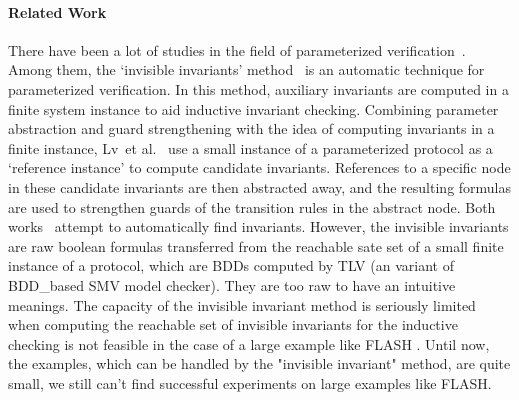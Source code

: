 \documentclass[final]{IEEEtran}
\begin{document}
\paragraph*{Related Work} There have been a lot of studies in the field of  parameterized
verification~\cite{Pnueli1996,Bjørner1997,Arons2001,Pnueli2001,Tiwari2001,Chou2004,Pandav2005,Lv2007,cubicle2011}.
Among them, the `invisible invariants' method~\cite{Arons2001}
is an automatic technique for parameterized verification. In this
method, auxiliary invariants are computed in a finite system
instance to aid inductive invariant checking. Combining parameter
abstraction and guard strengthening with the idea of computing
invariants in a finite instance, Lv~et al.~\cite{Lv2007} use a small instance of a
parameterized protocol as a `reference instance' to compute candidate
invariants. References to a specific
node in these candidate invariants are then abstracted away, and the
resulting formulas are used to strengthen guards of the transition
rules in the abstract node. Both works~\cite{Arons2001,Lv2007} attempt to automatically
find invariants. However, the invisible invariants are raw boolean formulas transferred from the reachable sate set of a small finite instance
of a protocol, which are BDDs computed by TLV (an variant of BDD\_based SMV model checker). They are too raw to have an intuitive meanings. The capacity of the invisible invariant method is seriously limited when computing the reachable  set of invisible invariants for  the inductive checking is not feasible in the case of a large example like FLASH . Until now, the  examples, which can be handled by the "invisible invariant" method, are quite small,  we still can't find successful experiments  on large examples like FLASH.
\end{document}
